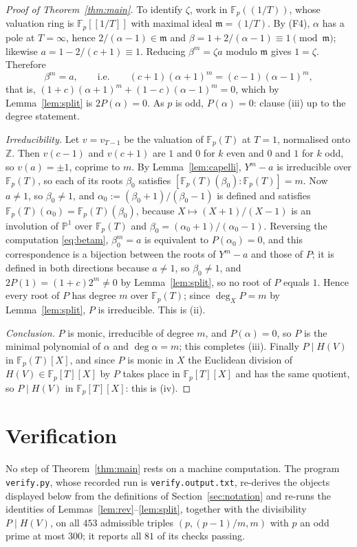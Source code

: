 \documentclass[11pt]{amsart}
\theoremstyle{remark}
\newcommand{\Fp}{\mathbb F_p}
\newcommand{\HV}{H(V)}
\begin{document}
\begin{proof}[Proof of Theorem~\ref{thm:main}]
To identify $\zeta$, work in $\Fp((1/T))$, whose valuation ring is $\Fp[[1/T]]$ with maximal ideal
$\mathfrak m=(1/T)$. By (F4), $\alpha$ has a pole at $T=\infty$, hence $2/(\alpha-1)\in\mathfrak m$
and $\beta=1+2/(\alpha-1)\equiv1\pmod{\mathfrak m}$; likewise $a=1-2/(c+1)\equiv1$. Reducing
$\beta^m=\zeta a$ modulo $\mathfrak m$ gives $1=\zeta$. Therefore
\begin{equation}\label{eq:betam}
 \beta^m=a,\qquad\text{i.e.}\qquad (c+1)(\alpha+1)^m=(c-1)(\alpha-1)^m,
\end{equation}
that is, $(1+c)(\alpha+1)^m+(1-c)(\alpha-1)^m=0$, which by Lemma~\ref{lem:split} is $2P(\alpha)=0$.
As $p$ is odd, $P(\alpha)=0$: clause (iii) up to the degree statement.

\emph{Irreducibility.} Let $v=v_{T-1}$ be the valuation of $\Fp(T)$ at $T=1$, normalised onto
$\mathbb Z$. Then $v(c-1)$ and $v(c+1)$ are $1$ and $0$ for $k$ even and $0$ and $1$ for $k$ odd,
so $v(a)=\pm1$, coprime to $m$. By Lemma~\ref{lem:capelli}, $Y^m-a$ is irreducible over $\Fp(T)$,
so each of its roots $\beta_0$ satisfies $[\Fp(T)(\beta_0):\Fp(T)]=m$. Now $a\ne1$, so
$\beta_0\ne1$, and $\alpha_0:=(\beta_0+1)/(\beta_0-1)$ is defined and satisfies
$\Fp(T)(\alpha_0)=\Fp(T)(\beta_0)$, because $X\mapsto(X+1)/(X-1)$ is an involution of
$\mathbb P^1$ over $\Fp(T)$ and $\beta_0=(\alpha_0+1)/(\alpha_0-1)$. Reversing the computation
\eqref{eq:betam}, $\beta_0^m=a$ is equivalent to $P(\alpha_0)=0$, and this correspondence is a
bijection between the roots of $Y^m-a$ and those of $P$; it is defined in both directions because
$a\ne1$, so $\beta_0\ne1$, and $2P(1)=(1+c)2^m\ne0$ by Lemma~\ref{lem:split}, so no root of $P$
equals $1$. Hence every root of $P$ has degree $m$
over $\Fp(T)$; since $\deg_XP=m$ by Lemma~\ref{lem:split}, $P$ is irreducible. This is (ii).

\emph{Conclusion.} $P$ is monic, irreducible of degree $m$, and $P(\alpha)=0$, so $P$ is the
minimal polynomial of $\alpha$ and $\deg\alpha=m$; this completes (iii). Finally $P\mid\HV$ in
$\Fp(T)[X]$, and since $P$ is monic in $X$ the Euclidean division of $\HV\in\Fp[T][X]$ by $P$ takes
place in $\Fp[T][X]$ and has the same quotient, so $P\mid\HV$ in $\Fp[T][X]$: this is (iv).
\end{proof}

\section{Verification}\label{sec:verify}

No step of Theorem~\ref{thm:main} rests on a machine computation. The program \texttt{verify.py},
whose recorded run is \texttt{verify.output.txt}, re-derives the objects displayed below from the
definitions of Section~\ref{sec:notation} and re-runs the identities of
Lemmas~\ref{lem:rev}--\ref{lem:split}, together with the divisibility $P\mid\HV$, on all $453$
admissible triples $(p,(p-1)/m,m)$ with $p$ an odd prime at most $300$; it reports all $81$ of its
checks passing.
\end{document}
